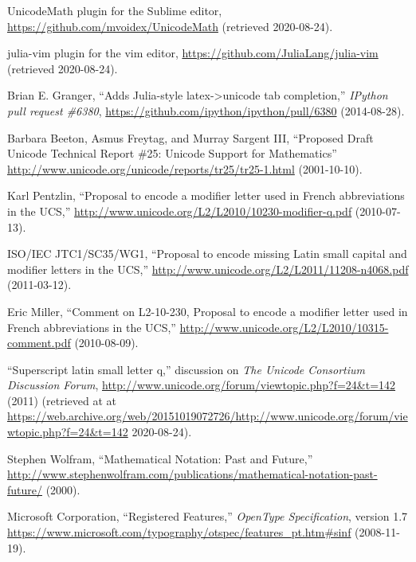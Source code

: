 \documentclass[10pt,english]{article}
\begin{document}
\begin{thebibliography}{10}
UnicodeMath plugin for the Sublime editor, \url{https://github.com/mvoidex/UnicodeMath}
(retrieved 2020-08-24).

julia-vim plugin for the vim editor, \url{https://github.com/JuliaLang/julia-vim}
(retrieved 2020-08-24).

Brian E. Granger, ``Adds Julia-style
latex->unicode tab completion,'' \emph{IPython pull
request \#6380}, \url{https://github.com/ipython/ipython/pull/6380}
(2014-08-28).

Barbara Beeton, Asmus Freytag, and Murray Sargent
III, ``Proposed Draft Unicode Technical Report \#25:
Unicode Support for Mathematics'' \url{http://www.unicode.org/unicode/reports/tr25/tr25-1.html} (2001-10-10).

Karl Pentzlin, ``Proposal to encode
a modifier letter used in French abbreviations in the UCS,''
\url{http://www.unicode.org/L2/L2010/10230-modifier-q.pdf}
(2010-07-13).

ISO/IEC JTC1/SC35/WG1, ``Proposal
to encode missing Latin small capital and modifier letters in the
UCS,'' \url{http://www.unicode.org/L2/L2011/11208-n4068.pdf}
(2011-03-12).

Eric Miller, ``Comment on L2-10-230,
Proposal to encode a modifier letter used in French abbreviations
in the UCS,'' \url{http://www.unicode.org/L2/L2010/10315-comment.pdf}
(2010-08-09).

``Superscript latin small letter q,''
discussion on \emph{The Unicode Consortium Discussion Forum}, \url{http://www.unicode.org/forum/viewtopic.php?f=24&t=142}
(2011) (retrieved at at \url{https://web.archive.org/web/20151019072726/http://www.unicode.org/forum/viewtopic.php?f=24&t=142}  2020-08-24).

Stephen Wolfram, ``Mathematical
Notation: Past and Future,'' \url{http://www.stephenwolfram.com/publications/mathematical-notation-past-future/}
(2000).

Microsoft Corporation, ``Registered
Features,'' \emph{OpenType Specification}, version
1.7 \url{https://www.microsoft.com/typography/otspec/features_pt.htm\#sinf}
(2008-11-19). \end{thebibliography}
\end{document}
